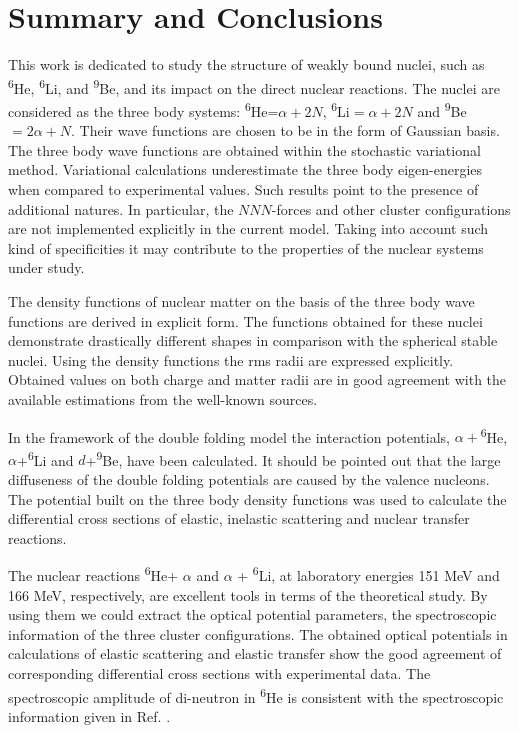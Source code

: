 \documentclass[
12pt, %
oneside, %
english, %
doublespacing, %
doublespacing, %
toctotoc, %
parskip, %
headsepline, %
]{MastersDoctoralThesis} %
\newcommand{\he}{\textsuperscript{6}He\xspace}
\newcommand{\li}{\textsuperscript{6}Li\xspace}
\newcommand{\be}{\textsuperscript{9}Be\xspace}
\begin{document}
\chapter*{Summary and Conclusions}   

This work is dedicated to study the structure of weakly bound nuclei, such as \he, \li, and \be, and its impact on the direct nuclear reactions. 
 The nuclei are considered as the three body systems: \he =$\alpha+2N$, \li$=\alpha+2N$ and \be$=2\alpha+N$. 
 Their wave functions are chosen to be in the form of Gaussian basis. 
 The three body wave functions are obtained within the stochastic variational method. 
 Variational calculations underestimate the three body eigen-energies when compared to experimental values.
  Such results point to the presence of additional natures. 
  In particular, the $NNN$-forces and other cluster configurations are not implemented explicitly in the current model.
   Taking into account such kind of specificities it may contribute to the properties of the nuclear systems under study.

The density functions of nuclear matter on the basis of the three body wave functions are derived in explicit form. 
The functions obtained for these nuclei demonstrate drastically different shapes in comparison with the spherical stable nuclei.
Using the density functions the rms radii are expressed explicitly.
Obtained values on both charge and matter radii are in good agreement with the available estimations from the well-known sources.
 

In the framework of the double folding model the interaction potentials, $\alpha+$\he, $\alpha$+\li and $d$+\be, have been calculated. 
It should be pointed out that the large diffuseness of the double folding potentials are caused by the valence nucleons.
The potential built on the three body density functions was used to calculate the differential cross sections of elastic, inelastic scattering and nuclear transfer reactions. 

The nuclear reactions \he + $\alpha$ and $\alpha$ + \li, at laboratory energies 151 MeV and 166 MeV, respectively, are excellent tools in terms of the theoretical study. 
By using them we could extract the optical potential parameters, the spectroscopic information of the three cluster configurations. 
The obtained optical potentials in calculations of elastic scattering and elastic transfer show the good agreement of corresponding differential cross sections with experimental data.
 The spectroscopic amplitude of di-neutron in \he is consistent with the spectroscopic information given in Ref. \cite{khoa2004di, oganessian1999dynamics}.
  
\end{document}
